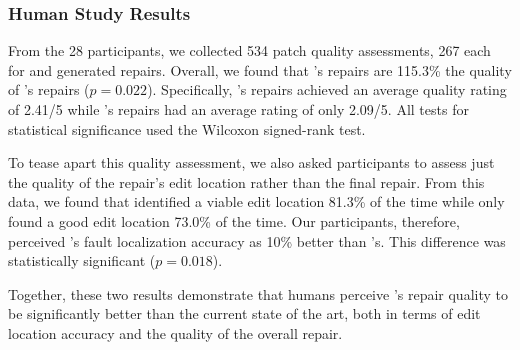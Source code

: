 \subsubsection{Human Study Results}
\label{subsubsec:study_res}


From the 28 participants, we collected 534 patch quality assessments, 267 each
for \toolname and \seminal generated repairs. Overall, we found that \toolname's
repairs are 115.3\% the quality of \seminal's repairs ($p=0.022$). Specifically,
\toolname's repairs achieved an average quality rating of 2.41/5 while
\seminal's repairs had an average rating of only 2.09/5. All tests for
statistical significance used the Wilcoxon signed-rank test.

To tease apart this quality assessment, we also asked participants to assess
just the quality of the repair's edit location rather than the final repair.
From this data, we found that \toolname identified a viable edit location 81.3\%
of the time while \seminal only found a good edit location 73.0\% of the time.
Our participants, therefore, perceived \toolname's fault localization accuracy
as 10\% better than \seminal's. This difference was statistically significant
($p=0.018$).


Together, these two results demonstrate that humans perceive \toolname's repair
quality to be significantly better than the current state of the art, both in
terms of edit location accuracy and the quality of the overall repair.


